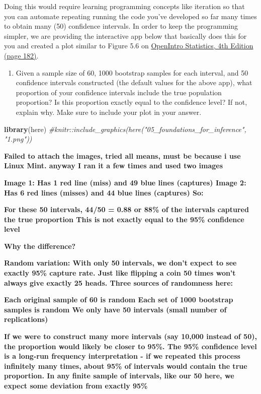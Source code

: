 \documentclass[
]{article}
\newenvironment{Shaded}{\begin{snugshade}}{\end{snugshade}}
\newcommand{\CommentTok}[1]{\textcolor[rgb]{0.56,0.35,0.01}{\textit{#1}}}
\newcommand{\FunctionTok}[1]{\textcolor[rgb]{0.13,0.29,0.53}{\textbf{#1}}}
\newcommand{\NormalTok}[1]{#1}
\providecommand{\tightlist}{%
  \setlength{\itemsep}{0pt}\setlength{\parskip}{0pt}}
\begin{document}
Doing this would require learning programming concepts like iteration so
that you can automate repeating running the code you've developed so far
many times to obtain many (50) confidence intervals. In order to keep
the programming simpler, we are providing the interactive app below that
basically does this for you and created a plot similar to Figure 5.6 on
\href{https://www.openintro.org/os}{OpenIntro Statistics, 4th Edition
(page 182)}.

\begin{enumerate}
\def\labelenumi{\arabic{enumi}.}
\tightlist
\item
  Given a sample size of 60, 1000 bootstrap samples for each interval,
  and 50 confidence intervals constructed (the default values for the
  above app), what proportion of your confidence intervals include the
  true population proportion? Is this proportion exactly equal to the
  confidence level? If not, explain why. Make sure to include your plot
  in your answer.
\end{enumerate}

\begin{Shaded}
\begin{Highlighting}[]
\FunctionTok{library}\NormalTok{(here)}
\CommentTok{\#knitr::include\_graphics(here("05\_foundations\_for\_inference", "1.png"))}
\end{Highlighting}
\end{Shaded}

\textbf{Failed to attach the images, tried all means, must be because i
use Linux Mint. anyway I ran it a few times and used two images}

\textbf{Image 1: Has 1 red line (miss) and 49 blue lines (captures)
Image 2: Has 6 red lines (misses) and 44 blue lines (captures) So:}

\textbf{For these 50 intervals, 44/50 = 0.88 or 88\% of the intervals
captured the true proportion This is not exactly equal to the 95\%
confidence level}

\textbf{Why the difference?}

\textbf{Random variation: With only 50 intervals, we don't expect to see
exactly 95\% capture rate. Just like flipping a coin 50 times won't
always give exactly 25 heads. Three sources of randomness here:}

\textbf{Each original sample of 60 is random Each set of 1000 bootstrap
samples is random We only have 50 intervals (small number of
replications)}

\textbf{If we were to construct many more intervals (say 10,000 instead
of 50), the proportion would likely be closer to 95\%. The 95\%
confidence level is a long-run frequency interpretation - if we repeated
this process infinitely many times, about 95\% of intervals would
contain the true proportion. In any finite sample of intervals, like our
50 here, we expect some deviation from exactly 95\%}
\end{document}
